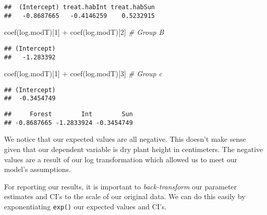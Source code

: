 \documentclass[
]{article}
\newenvironment{Shaded}{\begin{snugshade}}{\end{snugshade}}
\newcommand{\CommentTok}[1]{\textcolor[rgb]{0.56,0.35,0.01}{\textit{#1}}}
\newcommand{\DecValTok}[1]{\textcolor[rgb]{0.00,0.00,0.81}{#1}}
\newcommand{\FunctionTok}[1]{\textcolor[rgb]{0.00,0.00,0.00}{#1}}
\newcommand{\NormalTok}[1]{#1}
\newcommand{\OtherTok}[1]{\textcolor[rgb]{0.56,0.35,0.01}{#1}}
\newcommand{\SpecialCharTok}[1]{\textcolor[rgb]{0.00,0.00,0.00}{#1}}
\begin{document}
\begin{verbatim}
##  (Intercept) treat.habInt treat.habSun 
##   -0.8687665   -0.4146259    0.5232915
\end{verbatim}

\begin{Shaded}
\begin{Highlighting}[]
\FunctionTok{coef}\NormalTok{(log.modT)[}\DecValTok{1}\NormalTok{] }\SpecialCharTok{+} \FunctionTok{coef}\NormalTok{(log.modT)[}\DecValTok{2}\NormalTok{] }\CommentTok{\# Group B}
\end{Highlighting}
\end{Shaded}

\begin{verbatim}
## (Intercept) 
##   -1.283392
\end{verbatim}

\begin{Shaded}
\begin{Highlighting}[]
\FunctionTok{coef}\NormalTok{(log.modT)[}\DecValTok{1}\NormalTok{] }\SpecialCharTok{+} \FunctionTok{coef}\NormalTok{(log.modT)[}\DecValTok{3}\NormalTok{] }\CommentTok{\# Group c}
\end{Highlighting}
\end{Shaded}

\begin{verbatim}
## (Intercept) 
##  -0.3454749
\end{verbatim}

\begin{Shaded}
\end{Shaded}

\begin{verbatim}
##     Forest        Int        Sun 
## -0.8687665 -1.2833924 -0.3454749
\end{verbatim}

We notice that our expected values are all negative. This doesn't make
sense given that our dependent variable is dry plant height in
centimeters. The negative values are a result of our log transformation
which allowed us to meet our model's assumptions.

For reporting our results, it is important to \emph{back-transform} our
parameter estimates and CI's to the scale of our original data. We can
do this easily by exponentiating \texttt{exp()} our expected values and
CI's.
\end{document}
